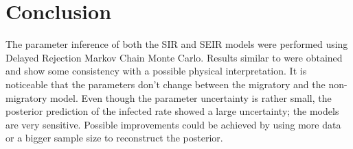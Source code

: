\documentclass[11pt, a4paper]{article}
\begin{document}
\section{Conclusion}
The parameter inference of both the SIR and SEIR models were performed using Delayed Rejection Markov Chain Monte Carlo. Results similar to \cite{coelho2011bayesian} were obtained and show some consistency with a possible physical interpretation. It is noticeable that the parameters don't change between the migratory and the non-migratory model. Even though the parameter uncertainty is rather small, the posterior prediction of the infected rate showed a large uncertainty; the models are very sensitive. Possible improvements could be achieved by using more data or a bigger sample size to reconstruct the posterior.









\end{document}
